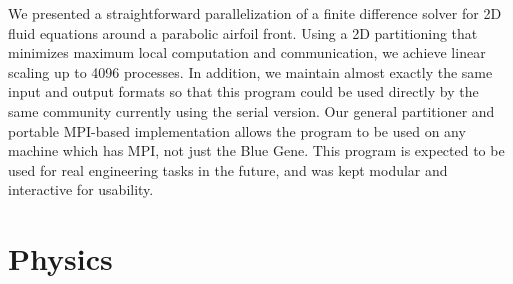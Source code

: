 \documentclass[twocolumn]{article}
\begin{document}
We presented a straightforward parallelization of a finite difference
solver for 2D fluid equations around a parabolic airfoil front.
Using a 2D partitioning that minimizes maximum local computation
and communication, we achieve linear scaling up to 4096 processes.
In addition, we maintain almost exactly the same input and output
formats so that this program could be used directly by the same
community currently using the serial version.
Our general partitioner and portable MPI-based implementation allows the program
to be used on any machine which has MPI, not just the Blue Gene.
This program is expected to be used for real engineering tasks
in the future, and was kept modular and interactive for usability.

\onecolumn
\section{Physics}
\label{sec:physics}

\end{document}

